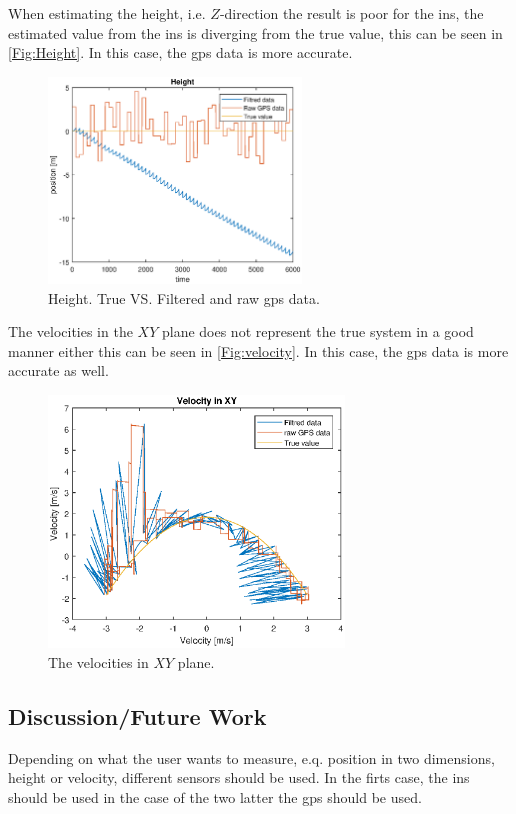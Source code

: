 When estimating the height, i.e. $Z$-direction the result is poor for the \gls{ins}, the estimated value from the \gls{ins} is diverging from the true value, this can be seen in \autoref{Fig:Height}. In this case, the \gls{gps} data is more accurate. 
\begin{figure}[H]
\centering
\includegraphics[width=0.6\textwidth]{Height.eps}
\caption{Height. True VS. Filtered and raw \gls{gps} data.}
\label{Fig:Height}
\end{figure}
The velocities in the $XY$ plane does not represent the true system in a good manner either this can be seen in \autoref{Fig:velocity}. In this case, the \gls{gps} data is more accurate as well.

\begin{figure}[H]
\centering
\includegraphics[width=0.7\textwidth]{velocity.eps}
\caption{The velocities in $XY$ plane.}
\label{Fig:velocity}
\end{figure}
\subsection{Discussion/Future Work}
Depending on what the user wants to measure, e.q. position in two dimensions, height or velocity, different sensors should be used. In the firts case, the \gls{ins} should be used in the case of the two latter the \gls{gps} should be used. 

